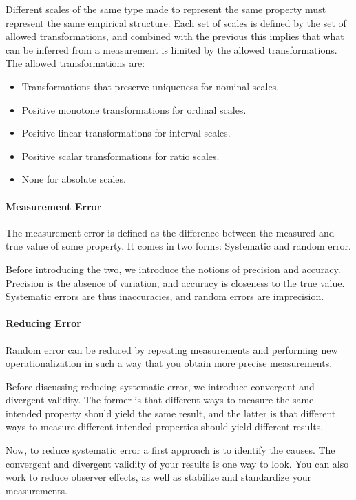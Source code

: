Different scales of the same type made to represent the same property must represent the same empirical structure. Each set of scales is defined by the set of allowed transformations, and combined with the previous this implies that what can be inferred from a measurement is limited by the allowed transformations. The allowed transformations are:
\begin{itemize}
	\item Transformations that preserve uniqueness for nominal scales.
	\item Positive monotone transformations for ordinal scales.
	\item Positive linear transformations for interval scales.
	\item Positive scalar transformations for ratio scales.
	\item None for absolute scales.
\end{itemize}

\paragraph{Measurement Error}
The measurement error is defined as the difference between the measured and true value of some property. It comes in two forms: Systematic and random error.

Before introducing the two, we introduce the notions of precision and accuracy. Precision is the absence of variation, and accuracy is closeness to the true value. Systematic errors are thus inaccuracies, and random errors are imprecision.

\paragraph{Reducing Error}
Random error can be reduced by repeating measurements and performing new operationalization in such a way that you obtain more precise measurements.

Before discussing reducing systematic error, we introduce convergent and divergent validity. The former is that different ways to measure the same intended property should yield the same result, and the latter is that different ways to measure different intended properties should yield different results.

Now, to reduce systematic error a first approach is to identify the causes. The convergent and divergent validity of your results is one way to look. You can also work to reduce observer effects, as well as stabilize and standardize your measurements.

